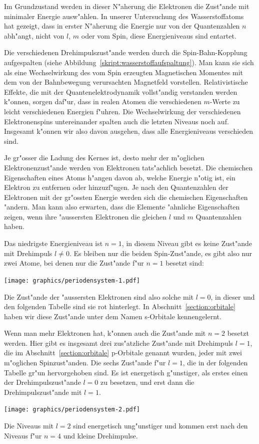 Im Grundzustand werden in dieser N"aherung die Elektronen die Zust"ande
mit minimaler Energie ausw"ahlen.
In unserer Untersuchung des Wasserstoffatoms hat gezeigt, dass in
erster N"aherung die Energie nur von der Quantenzahlen $n$ abh"angt,
nicht von $l$, $m$ oder vom Spin, diese Energieniveaus sind entartet.

Die verschiedenen Drehimpulszust"ande werden durch die Spin-Bahn-Kopplung
aufgespalten (siehe Abbildung~\ref{skript:wasserstoffaufspaltung}).
Man kann sie sich als eine Wechselwirkung des vom Spin erzeugten
Magnetischen Momentes mit dem von der Bahnbewegung verursachten
Magnetfeld vorstellen.
Relativistische Effekte, die mit der Quantenelektrodynamik vollst"andig
verstanden werden k"onnen, sorgen daf"ur, dass in realen Atomen
die verschiedenen $m$-Werte zu leicht verschiedenen Energien f"uhren.
Die Wechselwirkung der verschiedenen Elektronenspins untereinander
spalten auch die letzten Niveaus noch auf.
Insgesamt k"onnen wir also davon ausgehen, dass alle Energieniveaus
verschieden sind.

Je gr"osser die Ladung des Kernes ist, desto mehr der m"oglichen
Elektronenzust"ande werden von Elektronen tats"achlich besetzt.
Die chemischen Eigenschaften eines Atoms h"angen davon ab, welche
Energie n"otig ist, ein Elektron zu entfernen oder hinzuzf"ugen.
Je nach den Quantenzahlen der Elektronen mit der gr"ossten Energie
werden sich die chemischen Eigenschaften "andern.
Man kann also erwarten, dass die Elemente "ahnliche Eigenschaften
zeigen, wenn ihre "aussersten Elektronen die gleichen $l$ und $m$
Quantenzahlen haben.

Das niedrigste Energieniveau ist $n=1$, in diesem Niveau gibt es
keine Zust"ande mit Drehimpuls $l\ne 0$. Es bleiben nur die
beiden Spin-Zust"ande, es gibt also nur zwei Atome, bei denen nur
die Zust"ande f"ur $n=1$ besetzt sind:
\begin{center}
\texttt{[image: graphics/periodensystem-1.pdf]}
\end{center}
Die Zust"ande der "aussersten Elektronen sind also solche mit
$l=0$, in dieser und den folgenden Tabelle sind sie rot
hinterlegt.
In Abschnitt~\ref{section:orbitale} haben wir diese Zust"ande unter
dem Namen s-Orbitale kennengelernt.

Wenn man mehr Elektronen hat, k"onnen auch die Zust"ande mit $n=2$ 
besetzt werden.
Hier gibt es insgesamt drei zus"atzliche Zust"ande mit Drehimpuls $l=1$,
die im Abschnitt~\ref{section:orbitale} p-Orbitale genannt wurden,
jeder mit zwei m"oglichen Spinzust"anden.
Die sechs Zust"ande f"ur $l=1$, die in der folgenden Tabelle 
gr"un hervorgehoben sind.
Es ist energetisch g"unstiger, als erstes einen der
Drehimpulszust"ande $l=0$ zu besetzen, und erst dann die Drehimpulszust"ande
mit $l=1$.
\begin{center}
\texttt{[image: graphics/periodensystem-2.pdf]}
\end{center}
Die Niveaus mit $l=2$
sind energetisch ung"unstiger
und kommen erst nach
den Niveaus f"ur $n=4$ und kleine Drehimpulse.

